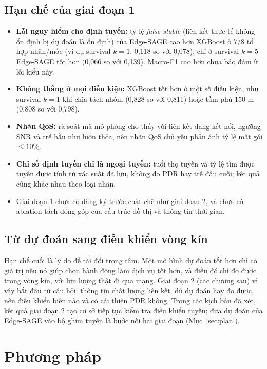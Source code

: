 \documentclass[12pt,a4paper]{report}
\begin{document}
\section{Hạn chế của giai đoạn 1}
\begin{itemize}
  \item \textbf{Lỗi nguy hiểm cho định tuyến:} tỷ lệ \emph{false-stable} (liên kết thực tế không ổn định bị dự đoán là ổn định) của Edge-SAGE cao hơn XGBoost ở 7/8 tổ hợp nhãn/mốc (ví dụ survival $k=1$: 0,118 so với 0,078); chỉ ở survival $k=5$ Edge-SAGE tốt hơn (0,066 so với 0,139). Macro-F1 cao hơn chưa bảo đảm ít lỗi kiểu này.
  \item \textbf{Không thắng ở mọi điều kiện:} XGBoost tốt hơn ở một số điều kiện, như survival $k=1$ khi chia tách nhóm (0,828 so với 0,811) hoặc tầm phủ 150 m (0,808 so với 0,798).
  \item \textbf{Nhãn QoS:} rà soát mã mô phỏng cho thấy với liên kết đang kết nối, ngưỡng SNR và trễ hầu như luôn thỏa, nên nhãn QoS chủ yếu phản ánh tỷ lệ mất gói $\le 10\%$.
  \item \textbf{Chỉ số định tuyến chỉ là ngoại tuyến:} tuổi thọ tuyến và tỷ lệ tìm được tuyến được tính từ xác suất đã lưu, không đo PDR hay trễ đầu cuối; kết quả cũng khác nhau theo loại nhãn.
  \item Giai đoạn 1 chưa có đăng ký trước chặt chẽ như giai đoạn 2, và chưa có ablation tách đóng góp của cấu trúc đồ thị và thông tin thời gian.
\end{itemize}

\section{Từ dự đoán sang điều khiển vòng kín}
Hạn chế cuối là lý do đề tài đổi trọng tâm. Một mô hình dự đoán tốt hơn chỉ có giá trị nếu nó giúp chọn hành động làm dịch vụ tốt hơn, và điều đó chỉ đo được trong vòng kín, với lưu lượng thật đi qua mạng. Giai đoạn 2 (các chương sau) vì vậy bắt đầu từ câu hỏi: thông tin chất lượng liên kết, dù dự đoán hay đo được, nên điều khiển biến nào và có cải thiện PDR không. Trong các kịch bản đã xét, kết quả giai đoạn 2 tạo cơ sở tiếp tục kiểm tra điều khiển tuyến; đưa dự đoán của Edge-SAGE vào bộ ghim tuyến là bước nối hai giai đoạn (Mục~\ref{sec:plan}).

\chapter{Phương pháp}\label{chap:method}
\end{document}
